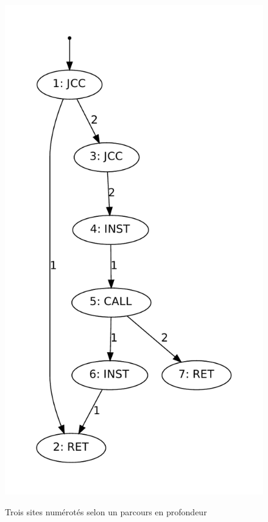 \begin{figure}[h]
\begin{center}
{\includegraphics[height=0.4\textheight]{supports/algos/images/g3prof.pdf}}
\end{center}
\caption{Trois sites numérotés selon un parcours en profondeur}
\label{fig:troisProf}
\end{figure}

